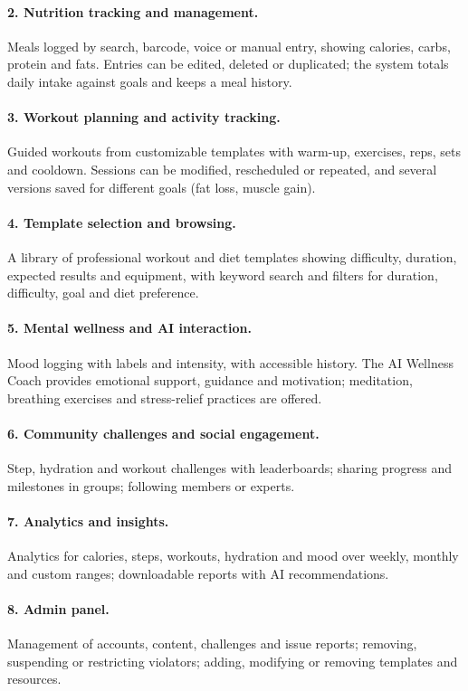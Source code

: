 \documentclass[11pt,a4paper]{report}
\begin{document}
\paragraph{2. Nutrition tracking and management.} Meals logged by search, barcode, voice or manual entry, showing calories, carbs, protein and fats. Entries can be edited, deleted or duplicated; the system totals daily intake against goals and keeps a meal history.
\paragraph{3. Workout planning and activity tracking.} Guided workouts from customizable templates with warm-up, exercises, reps, sets and cooldown. Sessions can be modified, rescheduled or repeated, and several versions saved for different goals (fat loss, muscle gain).
\paragraph{4. Template selection and browsing.} A library of professional workout and diet templates showing difficulty, duration, expected results and equipment, with keyword search and filters for duration, difficulty, goal and diet preference.
\paragraph{5. Mental wellness and AI interaction.} Mood logging with labels and intensity, with accessible history. The AI Wellness Coach provides emotional support, guidance and motivation; meditation, breathing exercises and stress-relief practices are offered.
\paragraph{6. Community challenges and social engagement.} Step, hydration and workout challenges with leaderboards; sharing progress and milestones in groups; following members or experts.
\paragraph{7. Analytics and insights.} Analytics for calories, steps, workouts, hydration and mood over weekly, monthly and custom ranges; downloadable reports with AI recommendations.
\paragraph{8. Admin panel.} Management of accounts, content, challenges and issue reports; removing, suspending or restricting violators; adding, modifying or removing templates and resources.
\end{document}
